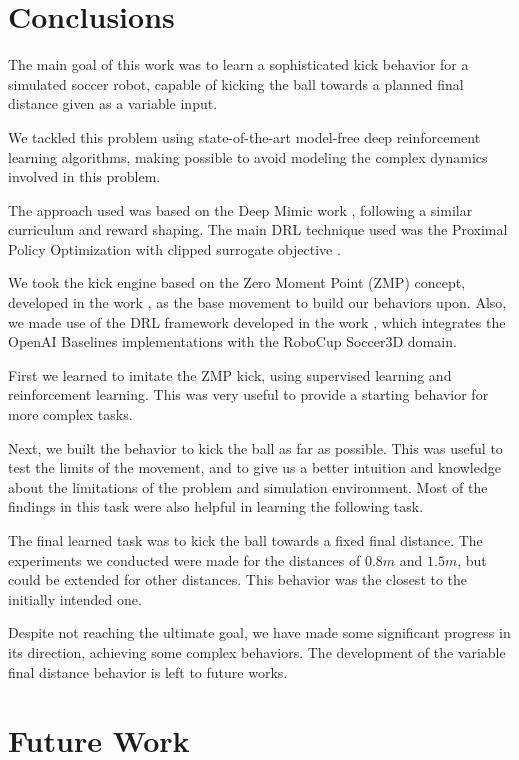 

\section{Conclusions}

The main goal of this work was to learn a sophisticated kick behavior for a simulated soccer robot, capable of kicking the ball towards a planned final distance given as a variable input.

We tackled this problem using state-of-the-art model-free deep reinforcement learning algorithms, making possible to avoid modeling the complex dynamics involved in this problem.

The approach used was based on the Deep Mimic work \cite{deep_mimic}, following a similar curriculum and reward shaping. The main DRL technique used was the Proximal Policy Optimization with clipped surrogate objective \cite{PPO}.

We took the kick engine based on the Zero Moment Point (ZMP) concept, developed in the work \cite{MestradoManga}, as the base movement to build our behaviors upon. Also, we made use of the DRL framework developed in the work \cite{TGMuzio}, which integrates the OpenAI Baselines \cite{baselines} implementations with the RoboCup Soccer3D domain.

First we learned to imitate the ZMP kick, using supervised learning and reinforcement learning. This was very useful to provide a starting behavior for more complex tasks.

Next, we built the behavior to kick the ball as far as possible. This was useful to test the limits of the movement, and to give us a better intuition and knowledge about the limitations of the problem and simulation environment. Most of the findings in this task were also helpful in learning the following task.

The final learned task was to kick the ball towards a fixed final distance. The experiments we conducted were made for the distances of $0.8m$ and $1.5m$, but could be extended for other distances. This behavior was the closest to the initially intended one.

Despite not reaching the ultimate goal, we have made some significant progress in its direction, achieving some complex behaviors. The development of the variable final distance behavior is left to future works.

\section{Future Work}

